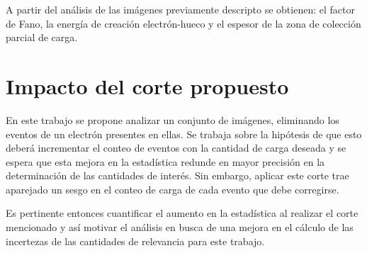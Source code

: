 A partir del análisis de las imágenes previamente descripto se obtienen: el factor de Fano, la energía de creación electrón-hueco y el espesor de la zona de colección parcial de carga.

\section{Impacto del corte propuesto}
\noindent En este trabajo se propone analizar un conjunto de imágenes, eliminando los eventos de un electrón presentes en ellas. Se trabaja sobre la hipótesis de que esto deberá incrementar el conteo de eventos con la cantidad de carga deseada y se espera que esta mejora en la estadística redunde en mayor precisión en la determinación de las cantidades de interés. Sin embargo, aplicar este corte trae aparejado un sesgo en el conteo de carga de cada evento que debe corregirse.

Es pertinente entonces cuantificar el aumento en la estadística al realizar el corte mencionado y así motivar el análisis en busca de una mejora en el cálculo de las incertezas de las cantidades de relevancia para este trabajo.

